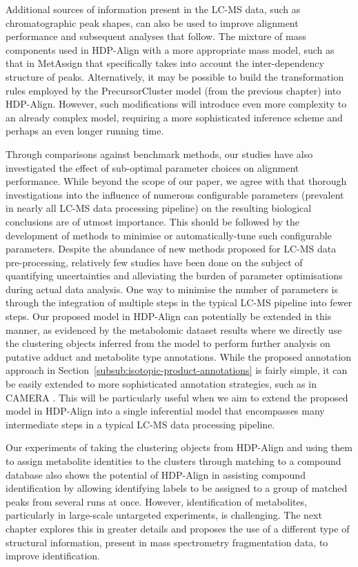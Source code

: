 Additional sources of information present in the LC-MS data, such as chromatographic peak shapes, can also be used to improve alignment performance and subsequent analyses that follow. The mixture of mass components used in HDP-Align with a more appropriate mass model, such as that in MetAssign \cite{Daly2014} that specifically takes into account the inter-dependency structure of peaks. Alternatively, it may be possible to build the transformation rules employed by the PrecursorCluster model (from the previous chapter) into HDP-Align. However, such modifications will introduce even more complexity to an already complex model, requiring a more sophisticated inference scheme and perhaps an even longer running time.

Through comparisons against benchmark methods, our studies have also investigated the effect of sub-optimal parameter choices on alignment performance. While beyond the scope of our paper, we agree with \cite{Smith2013, Smith2013a} that thorough investigations into the influence of numerous configurable parameters (prevalent in nearly all LC-MS data processing pipeline) on the resulting biological conclusions are of utmost importance. This should be followed by the development of methods to minimise or automatically-tune such configurable parameters. Despite the abundance of new methods proposed for LC-MS data pre-processing, relatively few studies have been done on the subject of quantifying uncertainties and alleviating the burden of parameter optimisations during actual data analysis. One way to minimise the number of parameters is through the integration of multiple steps in the typical LC-MS pipeline into fewer steps. Our proposed model in HDP-Align can potentially be extended in this manner, as evidenced by the metabolomic dataset results where we directly use the clustering objects inferred from the model to perform further analysis on putative adduct and metabolite type annotations. While the proposed annotation approach in Section~\ref{subsub:isotopic-product-annotations} is fairly simple, it can be easily extended to more sophisticated annotation strategies, such as in CAMERA \cite{Kuhl2012}. This will be particularly useful when we aim to extend the proposed model in HDP-Align into a single inferential model that encompasses many intermediate steps in a typical LC-MS data processing pipeline. 

Our experiments of taking the clustering objects from HDP-Align and using them to assign metabolite identities to the clusters through matching to a compound database also shows the potential of HDP-Align in assisting compound identification by allowing identifying labels to be assigned to a group of matched peaks from several runs at once. However, identification of metabolites, particularly in large-scale untargeted experiments, is challenging. The next chapter explores this in greater details and proposes the use of a different type of structural information, present in mass spectrometry fragmentation data, to improve identification.